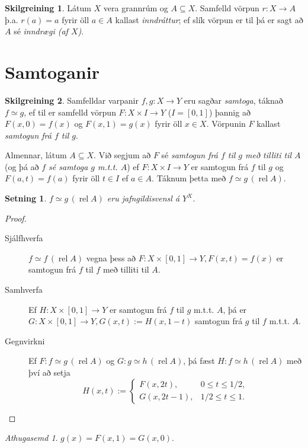 \documentclass[a4paper,icelandic]{book}
\theoremstyle{definition}
\newtheorem{skilgr}{Skilgreining}[section]
\theoremstyle{plain}
\newtheorem{setn}{Setning}[section]
\theoremstyle{remark}
\newtheorem*{ath}{Athugasemd}
\DeclareMathOperator{\rel}{rel}
\newcommand{\prel}[1]{\,\left(\rel #1\right)}
\begin{document}
\begin{skilgr}
  Látum $X$ vera grannrúm og $A\subseteq X$. Samfelld vörpun $r: X\to A$
  þ.a. $r(a) = a$ fyrir öll $a\in A$ kallast
  \emph{inndráttur}; ef slík vörpun er til þá er sagt
  að $A$ sé \emph{inndrægi (af $X$)}.
\end{skilgr}

\section{Samtoganir}
\begin{skilgr}
  Samfelldar varpanir $f,g:X\to Y$ eru sagðar
  \emph{samtoga}, táknað
  $f\simeq g$, ef til er samfelld vörpun $F:X\times I\to Y$ ($I = \left[
  0,1 \right]$) þannig að $F(x,0) = f(x)$ og $F(x,1) = g(x)$ fyrir öll
  $x\in X$. Vörpunin $F$ kallast \emph{samtogun frá $f$ til
  $g$}.

  Almennar, látum $A\subseteq X$. Við segjum að $F$ sé \emph{samtogun
  frá $f$ til $g$ með tilliti til $A$} (og þá að \emph{$f$ sé samtoga
  $g$ m.t.t. $A$}) ef $F:X\times I\to Y$ er samtogun frá $f$ til $g$ og
  $F(a,t)=f(a)$ fyrir öll $t\in I$ ef $a\in A$. Táknum þetta með
  $f\simeq g \prel A$.
\end{skilgr}
\begin{setn}
  $f\simeq g \prel A$ eru jafngildisvensl á $Y^X$.
\end{setn}
\begin{proof}
  \begin{description}
    \item[Sjálfhverfa] $f\simeq f \prel A$ vegna þess að
      $F:X\times[0,1]\to Y, F(x,t) = f(x)$ er samtogun frá $f$ til $f$
      með tilliti til $A$.
    \item[Samhverfa] Ef $H:X\times[0,1]\to Y$ er samtogun frá $f$ til
      $g$ m.t.t. $A$, þá er $G:X\times[0,1]\to Y, G(x,t):= H(x,1-t)$
      samtogun frá $g$ til $f$ m.t.t. $A$. 
    \item[Gegnvirkni] Ef $F:f\simeq g \prel A$ og $G:g\simeq
      h\prel A$, þá fæst $H:f\simeq h\prel A$ með því
      að setja\[
      H(x,t) := 
      \begin{cases}
        F(x,2t),   & 0 \leq t \leq 1/2,\\
        G(x,2t-1), & 1/2  \leq t\leq 1.
      \end{cases}
      \]
  \end{description}
\end{proof}
\begin{ath}
  $g(x) = F(x,1) = G(x,0)$.
\end{ath}
\end{document}
